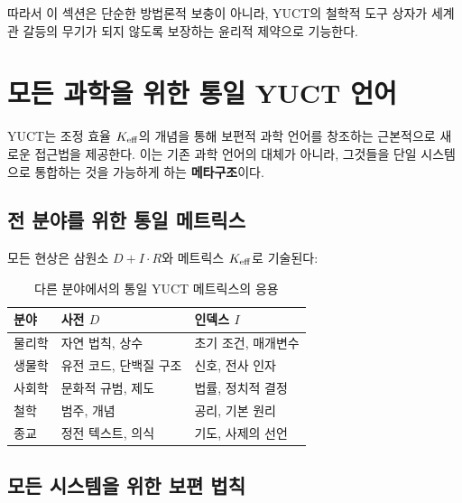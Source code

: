 \documentclass[11pt,a4paper]{article}
\begin{document}
	따라서 이 섹션은 단순한 방법론적 보충이 아니라, YUCT의 철학적 도구 상자가 세계관 갈등의 무기가 되지 않도록 보장하는 윤리적 제약으로 기능한다.
	
	
	\section{모든 과학을 위한 통일 YUCT 언어}
	
	YUCT는 조정 효율 \(\Keff\)의 개념을 통해 보편적 과학 언어를 창조하는 근본적으로 새로운 접근법을 제공한다. 이는 기존 과학 언어의 대체가 아니라, 그것들을 단일 시스템으로 통합하는 것을 가능하게 하는 \textbf{메타구조}이다.
	
	\subsection{전 분야를 위한 통일 메트릭스}
	
	모든 현상은 삼원소 \(D + I \cdot R\)와 메트릭스 \(\Keff\)로 기술된다:
	
	\begin{table}[H]
		\centering
		\caption{다른 분야에서의 통일 YUCT 메트릭스의 응용}
		\label{tab:unified-metrics}
		\begin{tabular}{p{3.5cm}p{4.5cm}p{4.5cm}}
			\toprule
			\textbf{분야} & \textbf{사전 \(D\)} & \textbf{인덱스 \(I\)} \\
			\midrule
			물리학 & 자연 법칙, 상수 & 초기 조건, 매개변수 \\
			생물학 & 유전 코드, 단백질 구조 & 신호, 전사 인자 \\
			사회학 & 문화적 규범, 제도 & 법률, 정치적 결정 \\
			철학 & 범주, 개념 & 공리, 기본 원리 \\
			종교 & 정전 텍스트, 의식 & 기도, 사제의 선언 \\
			\bottomrule
		\end{tabular}
	\end{table}
	
	\subsection{모든 시스템을 위한 보편 법칙}
	
\end{document}

